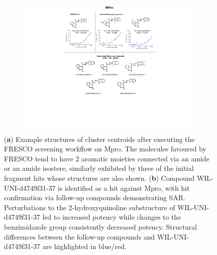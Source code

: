 \begin{figure}[!ph]
    \begin{subfigure}{\textwidth}
        \centering
        \includegraphics[width=0.75\linewidth]{Chapters/Fresco/Figs/mpro_hit_IC50.pdf}
    \end{subfigure}
    \caption{(\textbf{a}) Example structures of cluster centroids after executing the FRESCO screening workflow on Mpro. The molecules favoured by FRESCO tend to have 2 aromatic moieties connected via an amide or an amide isostere, similarly exhibited by three of the initial fragment hits whose structures are also shown. (\textbf{b}) Compound WIL-UNI-d4749f31-37 is identified as a hit against Mpro, with hit confirmation via follow-up compounds demonstrating SAR. Perturbations to the 2-hydroxyquinoline substructure of WIL-UNI-d4749f31-37 led to increased potency while changes to the benzimidazole group consistently decreased potency. Structural differences between the follow-up compounds and WIL-UNI-d4749f31-37 are highlighted in blue/red.}
    \label{fig:mpro_results}
\end{figure}


